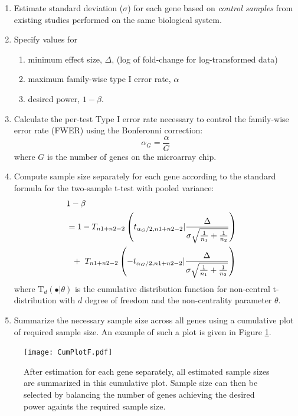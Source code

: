 \documentclass{bioinfo}
\begin{document}
\begin{enumerate}
\item{Estimate standard deviation ($\sigma$) for each gene based on
    \emph{control samples} from existing studies performed on the
    same biological system.}

\item{Specify values for
    \begin{enumerate}
    \item minimum effect size, $\Delta$, (log of fold-change for log-transformed data)
    \item maximum family-wise type I error rate, $\alpha$
    \item desired power, $1 - \beta$.
    \end{enumerate}
  }

\item{Calculate the per-test Type I error rate necessary to control
    the family-wise error rate (FWER) using the Bonferonni correction:}
\begin{equation}
  \alpha_G = \frac{\alpha}{G}
\end{equation}
%
where $G$ is the number of genes on the microarray chip.

\item{Compute sample size separately for each gene according to the
    standard formula for the two-sample t-test with pooled variance:}
  \begin{eqnarray}
    \lefteqn{1-\beta} \nonumber \\
    &= 1-T_{n1+n2-2} \left( t_{\alpha_G/2,n1+n2-2} | \frac{\Delta}{\sigma \sqrt{\frac{1}{n_1} + \frac{1}{n_2}}}\right) \nonumber \\
    &  ~~+~T_{n1+n2-2} \left( -t_{\alpha_G/2,n1+n2-2} | \frac{\Delta}{\sigma \sqrt{\frac{1}{n_1} + \frac{1}{n_2}}}\right)
    \label{eq:formula}
  \end{eqnarray}
  where $\mathrm{T}_{d}(\bullet|\theta)$ is the cumulative
  distribution function for non-central t-distribution with $d$ degree
  of freedom and the non-centrality parameter $\theta$.

\item{Summarize the necessary sample size across all genes using a
    cumulative plot of required sample size. An example of such a plot
    is given in Figure \ref{fig:CumPlot}.}

\end{enumerate}

\begin{figure}[h]
  \centerline{\texttt{[image: CumPlotF.pdf]}}
  \caption[Cumulative Plot of Sample Size Calculated for All Genes]
  {After estimation for each gene separately, all estimated sample
    sizes are summarized in this cumulative plot. Sample size can then
    be selected by balancing the number of genes achieving the desired
    power againts the required sample size.}
  \label{fig:CumPlot}
\end{figure}
\end{document}
